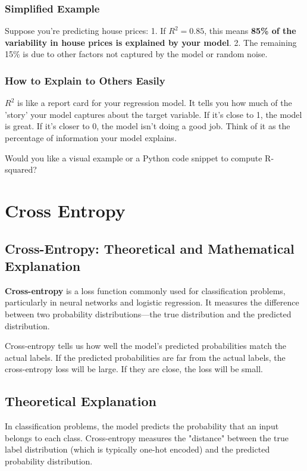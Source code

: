 \documentclass[12pt]{book}
\begin{document}
\subsection*{ \textbf{Simplified Example}}

Suppose you're predicting house prices:
1. If \(R^2 = 0.85\), this means \textbf{85\% of the variability in house prices is explained by your model}. 
2. The remaining 15\% is due to other factors not captured by the model or random noise.


\subsection*{ \textbf{How to Explain to Others Easily}}
\(R^2\) is like a report card for your regression model. It tells you how much of the 'story' your model captures about the target variable. If it's close to 1, the model is great. If it's closer to 0, the model isn't doing a good job. Think of it as the percentage of information your model explains.

Would you like a visual example or a Python code snippet to compute R-squared?


\chapter{Cross Entropy}

\section{Cross-Entropy: Theoretical and Mathematical Explanation}

\textbf{Cross-entropy} is a loss function commonly used for classification problems, particularly in neural networks and logistic regression. It measures the difference between two probability distributions—the true distribution and the predicted distribution.

Cross-entropy tells us how well the model's predicted probabilities match the actual labels. If the predicted probabilities are far from the actual labels, the cross-entropy loss will be large. If they are close, the loss will be small.

\section{Theoretical Explanation}

In classification problems, the model predicts the probability that an input belongs to each class. Cross-entropy measures the "distance" between the true label distribution (which is typically one-hot encoded) and the predicted probability distribution.
\end{document}
